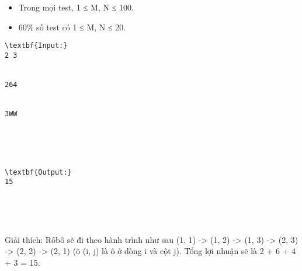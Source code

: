 \begin{itemize}
	\item     Trong mọi test, 1 ≤ M, N ≤ 100.   
	\item     60\% số test có 1 ≤ M, N ≤ 20.   
\end{itemize}
\begin{verbatim}
\textbf{Input:}
2 3


264


3WW





\textbf{Output:}
15





\end{verbatim}

Giải thích: Rôbô sẽ đi theo hành trình như sau (1, 1) -> (1, 2) -> (1, 3) -> (2, 3) -> (2, 2) -> (2, 1) (ô (i, j) là ô ở dòng i và cột j). Tổng lợi nhuận sẽ là 2 + 6 + 4 + 3 = 15.
